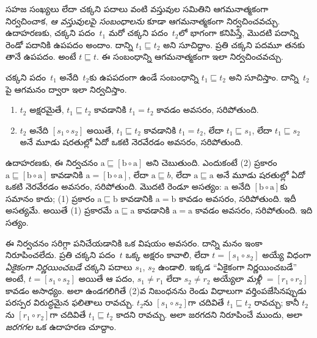 \documentclass[../../../include/open-logic-section]{subfiles}
\begin{document}


సహజ సంఖ్యలు లేదా చక్కని పదాలు వంటి వస్తువుల సమితిని
ఆగమనాత్మకంగా నిర్వచించాక, \emph{ఆ వస్తువులపై సంబంధాలను}
కూడా ఆగమనాత్మకంగా నిర్వచించవచ్చు. ఉదాహరణకు, చక్కని పదం~$t_1$
మరో చక్కని పదం~$t_2$లో భాగంగా కనిపిస్తే, మొదటి పదాన్ని రెండో
పదానికి ఉపపదం అందాం. దాన్ని $t_1 \sqsubseteq t_2$ అని సూచిద్దాం.
ప్రతి చక్కని పదమూ తనకు తానే ఉపపదం. అంటే $t \sqsubseteq t$.
ఈ సంబంధాన్ని ఆగమనాత్మకంగా ఇలా నిర్వచించవచ్చు.

\begin{defn}
  చక్కని పదం~$t_1$ అనేది~$t_2$కు ఉపపదంగా ఉండే సంబంధాన్ని
  $t_1 \sqsubseteq t_2$ అని సూచిస్తాం. దాన్ని~$t_2$పై ఆగమనం
  ద్వారా ఇలా నిర్వచిస్తాం.
  \begin{enumerate}
  \item $t_2$ అక్షరమైతే, $t_1 \sqsubseteq t_2$ కావడానికి $t_1 = t_2$ కావడం అవసరం, సరిపోతుంది.
  \item $t_2$ అనేది $[s_1 \circ s_2]$ అయితే, $t_1 \sqsubseteq t_2$ కావడానికి $t_1 =
    t_2$, లేదా $t_1 \sqsubseteq s_1$, లేదా $t_1 \sqsubseteq s_2$ అనే మూడు షరతుల్లో ఏదో ఒకటి నెరవేరడం అవసరం, సరిపోతుంది.
  \end{enumerate}
\end{defn}

ఉదాహరణకు, ఈ నిర్వచనం $\mathrm{a}
\sqsubseteq [\mathrm{b} \circ \mathrm{a}]$ అని చెబుతుంది. ఎందుకంటే (2) ప్రకారం $\mathrm{a} \sqsubseteq [\mathrm{b} \circ \mathrm{a}]$ కావడానికి $\mathrm{a}
= [\mathrm{b} \circ \mathrm{a}]$, లేదా $\mathrm{a} \sqsubseteq b$, లేదా $\mathrm{a} \sqsubseteq \mathrm{a}$ అనే మూడు షరతుల్లో ఏదో ఒకటి నెరవేరడం అవసరం, సరిపోతుంది. మొదటి రెండూ అసత్యం: $\mathrm{a}$ అనేది $[\mathrm{b} \circ
  \mathrm{a}]$కు సమానం కాదు; (1) ప్రకారం $\mathrm{a} \sqsubseteq \mathrm{b}$ కావడానికి $\mathrm{a} = \mathrm{b}$ కావడం అవసరం, సరిపోతుంది. ఇదీ అసత్యమే. అయితే (1) ప్రకారమే $\mathrm{a} \sqsubseteq \mathrm{a}$ కావడానికి $\mathrm{a} = \mathrm{a}$ కావడం అవసరం, సరిపోతుంది. ఇది సత్యం.

ఈ నిర్వచనం సరిగ్గా పనిచేయడానికి ఒక విషయం అవసరం. దాన్ని మనం ఇంకా నిరూపించలేదు. ప్రతి చక్కని పదం~$t$ ఒక్క అక్షరం కావాలి, లేదా $t = [s_1 \circ s_2]$ అయ్యే విధంగా \emph{ఏకైకంగా నిర్ణయించబడే} చక్కని పదాలు $s_1$, $s_2$ ఉండాలి. ఇక్కడ ``ఏకైకంగా నిర్ణయించబడే'' అంటే, $t = [s_1 \circ s_2]$ అయితే ఆ పదం, $s_1 \neq r_1$ లేదా $s_2 \neq r_2$ అయ్యేలా \emph{మళ్లీ} $= [r_1 \circ r_2]$ కావడం అసాధ్యం. అలా ఉండగలిగితే (2)వ నిబంధనను రెండు విధాలుగా వర్తింపజేసినప్పుడు పరస్పర విరుద్ధమైన ఫలితాలు రావచ్చు. $t_2$ను $[s_1 \circ s_2]$గా చదివితే $t_1
\sqsubseteq t_2$ రావచ్చు; కానీ $t_2$ను $[r_1 \circ r_2]$గా చదివితే $t_1 \sqsubseteq t_2$ కాదని రావచ్చు. అలా జరగదని నిరూపించే ముందు, అలా \emph{జరగగల} ఒక ఉదాహరణ చూద్దాం.
\end{document}

